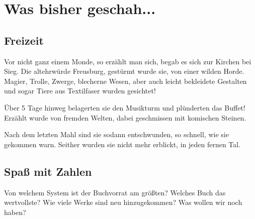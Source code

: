 
%



\usepackage{enumitem}
\usepackage{cancel}









%



\makemultititle
%

\section{Was bisher geschah...}

\subsection{Freizeit}
Vor nicht ganz einem Monde, so erzählt man sich, begab es sich zur Kirchen bei Sieg.
Die altehrwürde Freusburg, gestürmt wurde sie, von einer wilden Horde.
Magier, Trolle, Zwerge, blecherne Wesen, aber auch leicht bekleidete Gestalten und sogar Tiere aus Textilfaser wurden gesichtet!

Über 5 Tage hinweg belagerten sie den Musikturm und plünderten das Buffet!
Erzählt wurde von fremden Welten, dabei geschmissen mit komischen Steinen.

Nach dem letzten Mahl sind sie sodann entschwunden, so schnell, wie sie gekommen warn.
Seither wurden sie nicht mehr erblickt, in jeden fernen Tal.

\subsection{Spaß mit Zahlen}
Von welchem System ist der Buchvorrat am größten?
Welches Buch das wertvollste?
Wie viele Werke sind neu hinzugekommen?
Was wollen wir noch haben?

